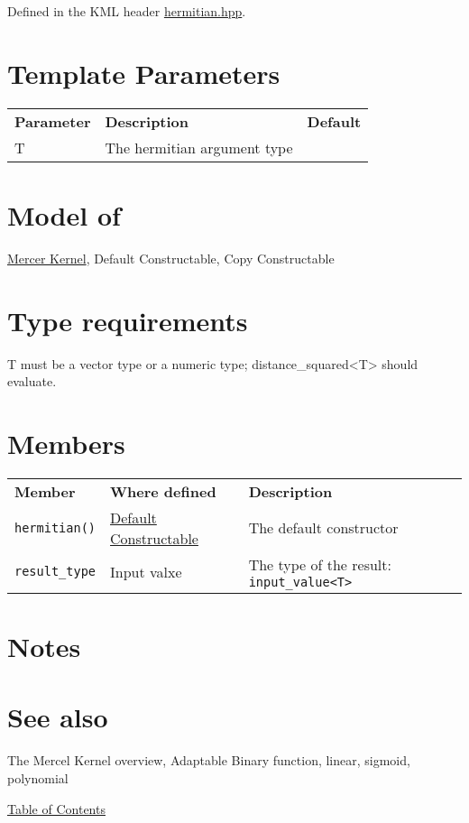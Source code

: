\documentclass{article}
\begin{document}
Defined in the KML header \href{hermitian.hpp}{hermitian.hpp}.


\section*{Template Parameters}

\begin{tabular}{lll}
\textbf{Parameter} & \textbf{Description} & \textbf{Default} \\ 
T & The hermitian argument type \\ 
\end{tabular}


\section*{Model of}

\href{research/kml/documentation/mercer_kernel.html}{Mercer Kernel}, 
Default Constructable, Copy Constructable

\section*{Type requirements}

T must be a vector type or a numeric type; distance_squared<T> should evaluate.


\section*{Members}

\begin{tabular}{lll}
\textbf{Member} & \textbf{Where defined} & \textbf{Description} \\ 
\texttt{hermitian()} & \href{http://www.sgi.com/tech/stl/DefaultConstructible.html}{Default Constructable} & The default constructor \\
\texttt{result_type} & Input valxe & The type of the result: \texttt{input_value<T>} \\
\end{tabular}

\section*{Notes}

\section*{See also}

The Mercel Kernel overview, Adaptable Binary function, linear, sigmoid, polynomial

\noindent \href{research/kml/documentation/}{Table of Contents}



\end{document}
